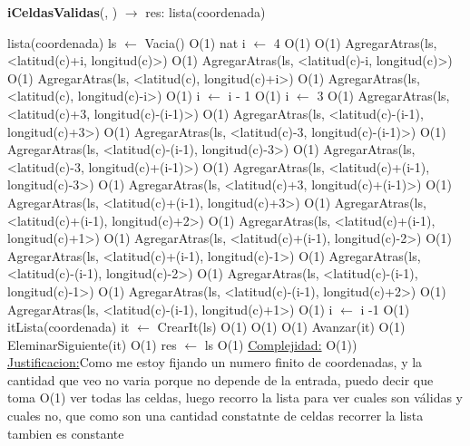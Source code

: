 \begin{Algoritmos}
\begin{algorithm}[H]{\textbf{iCeldasValidas}(, ) $\to$ res: lista(coordenada)}
	\begin{algorithmic}[1]
		\State lista(coordenada) ls $\gets$ Vacia() \Comment O(1)
		\State nat i $\gets$ 4 \Comment O(1)
		 \Comment O(1)
			\State AgregarAtras(ls, <latitud(c)+i, longitud(c)>) \Comment O(1)
			\State AgregarAtras(ls, <latitud(c)-i, longitud(c)>) \Comment O(1)
			\State AgregarAtras(ls, <latitud(c), longitud(c)+i>) \Comment O(1)
			\State AgregarAtras(ls, <latitud(c), longitud(c)-i>) \Comment O(1)
			\State i $\gets$ i - 1 \Comment O(1)
		\EndWhile
		\State i $\gets$ 3
		 \Comment O(1)
			\State AgregarAtras(ls, <latitud(c)+3, longitud(c)-(i-1)>) \Comment O(1)
			\State AgregarAtras(ls, <latitud(c)-(i-1), longitud(c)+3>) \Comment O(1)
			\State AgregarAtras(ls, <latitud(c)-3, longitud(c)-(i-1)>) \Comment O(1)
			\State AgregarAtras(ls, <latitud(c)-(i-1), longitud(c)-3>) \Comment O(1)
			\State AgregarAtras(ls, <latitud(c)-3, longitud(c)+(i-1)>) \Comment O(1)
			\State AgregarAtras(ls, <latitud(c)+(i-1), longitud(c)-3>) \Comment O(1)
			\State AgregarAtras(ls, <latitud(c)+3, longitud(c)+(i-1)>) \Comment O(1)
			\State AgregarAtras(ls, <latitud(c)+(i-1), longitud(c)+3>) \Comment O(1)
			\State AgregarAtras(ls, <latitud(c)+(i-1), longitud(c)+2>) \Comment O(1)
			\State AgregarAtras(ls, <latitud(c)+(i-1), longitud(c)+1>) \Comment O(1)
			\State AgregarAtras(ls, <latitud(c)+(i-1), longitud(c)-2>) \Comment O(1)
			\State AgregarAtras(ls, <latitud(c)+(i-1), longitud(c)-1>) \Comment O(1)
			\State AgregarAtras(ls, <latitud(c)-(i-1), longitud(c)-2>) \Comment O(1)
			\State AgregarAtras(ls, <latitud(c)-(i-1), longitud(c)-1>) \Comment O(1)
			\State AgregarAtras(ls, <latitud(c)-(i-1), longitud(c)+2>) \Comment O(1)
			\State AgregarAtras(ls, <latitud(c)-(i-1), longitud(c)+1>) \Comment O(1)			
			\State i $\gets$ i -1 \Comment O(1) 
		\EndWhile
		\State itLista(coordenada) it $\gets$ CrearIt(ls) \Comment O(1)		
		 \Comment O(1)
			 \Comment O(1)
				\State Avanzar(it) \Comment O(1) 
			\Else
				\State EleminarSiguiente(it) \Comment O(1)			
			\EndIf
		\EndWhile
		\State res $\gets$ ls \Comment O(1)
		\medskip
		\Statex \underline{Complejidad:} O(1))
		\Statex \underline{Justificacion:}Como me estoy fijando un numero finito de coordenadas, y la cantidad que veo no varia porque no depende de la entrada, puedo decir que toma O(1) ver todas las celdas, luego recorro la lista para ver cuales son válidas y cuales no, que como son una cantidad constatnte de celdas recorrer la lista tambien es constante
	\end{algorithmic}
\end{algorithm}



\end{Algoritmos}
